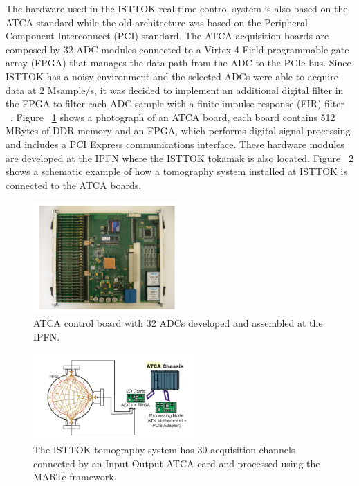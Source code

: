 The hardware used in the ISTTOK real-time control system is also  based on the ATCA standard while the old architecture was based on the Peripheral Component Interconnect (PCI) standard. The ATCA acquisition boards are composed by 32  ADC modules connected to a Virtex-4 Field-programmable gate array (FPGA) that manages the data path from the ADC to the PCIe bus.  Since ISTTOK has a noisy environment and the selected ADCs were able to acquire data at 2 Msample/s, it was decided to implement an additional digital filter in the FPGA to filter each ADC sample with a finite impulse response (FIR) filter ~\cite{ISTTOK_RT}. Figure ~\ref{PCIe} shows a photograph of an ATCA board, each board contains 512 MBytes of DDR memory and an FPGA, which performs digital signal processing and includes a PCI Express communications interface. These hardware modules are developed at the IPFN where the ISTTOK tokamak is also located. Figure ~\ref{Tomog} shows a schematic example of how a tomography system installed at ISTTOK is connected to the ATCA boards.  \smallskip 

\begin{figure}[htbp]
	\centering
	\includegraphics[width=0.5\textwidth]{Chp2/PCIboard.png}
	\caption{\label{PCIe}  ATCA control board with 32 ADCs developed and assembled  at the IPFN. \cite{ATCA2010}}
	
\end{figure}

\begin{figure}[htbp]
	\centering
	\includegraphics[width=0.55\textwidth]{Chp2/Tomogr.png}
	\caption{\label{Tomog}  The ISTTOK tomography system has 30 acquisition channels connected by an Input-Output ATCA card and processed using the MARTe framework.  \cite{Ivo_tomo}}
	
\end{figure}

